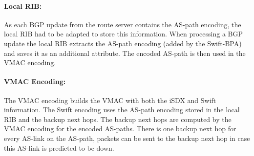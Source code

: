 \paragraph{\label{chapter4:Changes to the iSDX:local RIB}Local RIB:}

As each BGP update from the route server contains the AS-path encoding, the local RIB had to be adapted to store this information. 
When processing a BGP update the local RIB extracts the AS-path encoding (added by the Swift-BPA) and saves it as an additional attribute. The encoded AS-path is then used in the VMAC encoding. 

\paragraph{\label{chapter4:Changes to the iSDX:Vmac Encoding}VMAC Encoding:}
The VMAC encoding builds the VMAC with both  the iSDX and Swift information. The Swift encoding uses the AS-path encoding stored in the local RIB and the backup next hops. The backup next hops are computed by the VMAC encoding for the encoded AS-paths. There is one backup next hop for every AS-link on the AS-path, packets can be sent to the backup next hop in case this AS-link is predicted to be down. \\

\newpage
